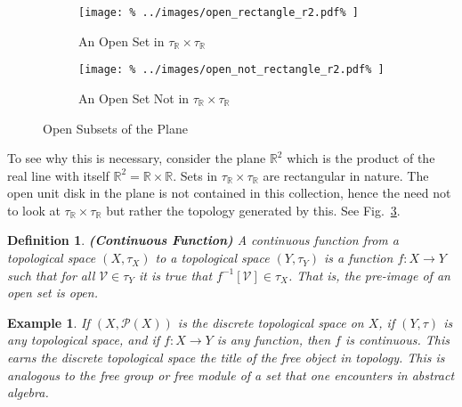 \documentclass{article}
\theoremstyle{plain}
\theoremstyle{normal}
\newtheorem{definition}{Definition}[section]
\newtheorem{example}{Example}[section]
\begin{document}
        \begin{figure}
        	\centering
        	\begin{subfigure}[b]{0.49\textwidth}
                \centering
                \texttt{[image: \%
                    ../images/open\_rectangle\_r2.pdf\%
                ]}
                \caption{An Open Set in $\tau_{\mathbb{R}}\times\tau_{\mathbb{R}}$}
                \label{fig:open_rectangle_r2}
            \end{subfigure}
            \hfill
            \begin{subfigure}[b]{0.49\textwidth}
                \centering
                \texttt{[image: \%
                    ../images/open\_not\_rectangle\_r2.pdf\%
                ]}
                \caption{An Open Set Not in $\tau_{\mathbb{R}}\times\tau_{\mathbb{R}}$}
                \label{fig:commutative_diagram_cofree_object_in_topology}
            \end{subfigure}
            \caption{Open Subsets of the Plane}
            \label{fig:open_subsets_of_r2}
        \end{figure}
        To see why this is necessary, consider the plane $\mathbb{R}^{2}$ which
        is the product of the real line with itself
        $\mathbb{R}^{2}=\mathbb{R}\times\mathbb{R}$. Sets in
        $\tau_{\mathbb{R}}\times\tau_{\mathbb{R}}$ are rectangular in nature.
        The open unit disk in the plane is not contained in this collection,
        hence the need not to look at $\tau_{\mathbb{R}}\times\tau_{\mathbb{R}}$
        but rather the topology generated by this.
        See Fig.~\ref{fig:open_subsets_of_r2}.
        \begin{definition}{\textbf{(Continuous Function)}}
            A continuous function from a topological space $(X,\tau_{X})$ to
            a topological space $(Y,\tau_{Y})$ is a function $f:X\rightarrow{Y}$
            such that for all $\mathcal{V}\in\tau_{Y}$ it is true that
            $f^{-1}[\mathcal{V}]\in\tau_{X}$. That is, the pre-image of an open
            set is open.
        \end{definition}
        \begin{example}
            If $(X,\mathcal{P}(X))$ is the discrete topological space on $X$,
            if $(Y,\tau)$ is any topological space, and if $f:X\rightarrow{Y}$
            is any function, then $f$ is continuous. This earns the discrete
            topological space the title of the \textit{free object} in topology.
            This is analogous to the \textit{free group} or \textit{free module}
            of a set that one encounters in abstract algebra.
        \end{example}
\end{document}
